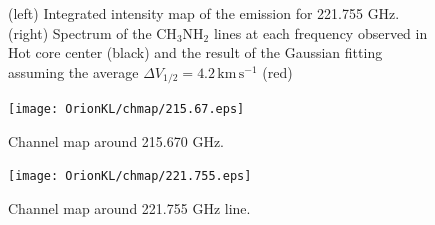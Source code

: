 \begin{figure}[htp]
\begin{center}
\begin{minipage}{0.98\textwidth}
\begin{center}
\begin{minipage}{0.48\textwidth}
\begin{center}
\end{center}
\end{minipage}
\end{center}
\end{minipage}
\caption{(left) Integrated intensity map of the emission for 221.755 GHz. (right) Spectrum of the CH$_3$NH$_2$ lines at each frequency observed in Hot core center (black)  and the result of the Gaussian fitting assuming the average $\Delta V_{1/2} = 4.2\, \mathrm{km\,s^{-1}}$ (red)}
\end{center}
\end{figure}

\begin{figure}[htp]
  \centering
  \texttt{[image: OrionKL/chmap/215.67.eps]}
  \caption{Channel map around 215.670 GHz.}
  \label{ch_4}
\end{figure}

\begin{figure}[htp]
  \centering
  \texttt{[image: OrionKL/chmap/221.755.eps]}
  \caption{Channel map around 221.755 GHz line.}
  \label{ch_6}
\end{figure}
